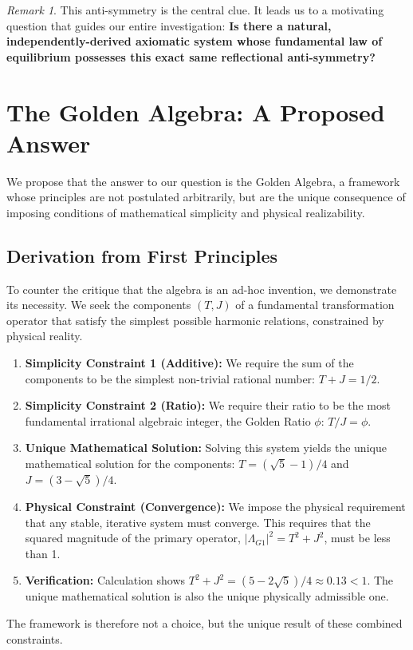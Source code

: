 \documentclass{article}
\theoremstyle{plain}
\theoremstyle{definition}
\theoremstyle{remark}
\newtheorem*{remark}{Remark}
\begin{document}
\begin{remark}
This anti-symmetry is the central clue. It leads us to a motivating question that guides our entire investigation: \textbf{Is there a natural, independently-derived axiomatic system whose fundamental law of equilibrium possesses this exact same reflectional anti-symmetry?}
\end{remark}

\section{The Golden Algebra: A Proposed Answer}
\label{sec:algebra}
We propose that the answer to our question is the Golden Algebra, a framework whose principles are not postulated arbitrarily, but are the unique consequence of imposing conditions of mathematical simplicity and physical realizability.

\subsection{Derivation from First Principles}
To counter the critique that the algebra is an ad-hoc invention, we demonstrate its necessity. We seek the components $(T, J)$ of a fundamental transformation operator that satisfy the simplest possible harmonic relations, constrained by physical reality.
\begin{enumerate}
    \item \textbf{Simplicity Constraint 1 (Additive):} We require the sum of the components to be the simplest non-trivial rational number: $T+J=1/2$.
    \item \textbf{Simplicity Constraint 2 (Ratio):} We require their ratio to be the most fundamental irrational algebraic integer, the Golden Ratio $\phi$: $T/J=\phi$.
    \item \textbf{Unique Mathematical Solution:} Solving this system yields the unique mathematical solution for the components: $T = (\sqrt{5}-1)/4$ and $J = (3-\sqrt{5})/4$.
    \item \textbf{Physical Constraint (Convergence):} We impose the physical requirement that any stable, iterative system must converge. This requires that the squared magnitude of the primary operator, $|\Lambda_{G1}|^2 = T^2+J^2$, must be less than 1.
    \item \textbf{Verification:} Calculation shows $T^2+J^2 = (5-2\sqrt{5})/4 \approx 0.13 < 1$. The unique mathematical solution is also the unique physically admissible one.
\end{enumerate}
The framework is therefore not a choice, but the unique result of these combined constraints.
\end{document}
